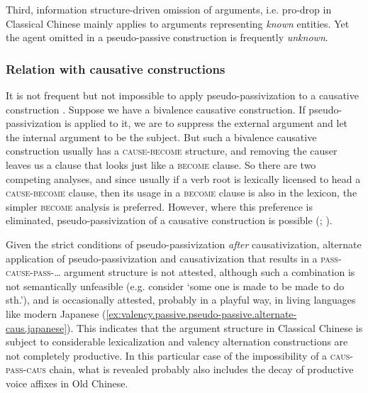 \documentclass[UTF8, a4paper, oneside, scheme=plain, 12pt]{ctexrep}
\newcommand*{\citepage}[1]{p.~{#1}}
\newcommand*{\citepages}[1]{pp.~{#1}}
\newcommand{\translate}[1]{`#1'}
\newcommand*{\category}[1]{\textsc{#1}}
\begin{document}
Third, information structure-driven omission of arguments, i.e. pro-drop in Classical Chinese mainly applies to arguments representing \emph{known} entities.
Yet the agent omitted in a pseudo-passive construction is frequently \emph{unknown}.

\subsubsection{Relation with causative constructions}\label{sec:grammatical.clause.verbal.argument-structure.pseudo-passive.causative-relation}

It is not frequent but not impossible to apply pseudo-passivization to a causative construction
\citep[\citepage{283}]{meiguang2018}.
Suppose we have a bivalence causative construction.
If pseudo-passivization is applied to it,
we are to suppress the external argument and let the internal argument to be the subject.
But such a bivalence causative construction usually has a \category{cause}-\category{become} structure,
and removing the causer leaves us a clause that looks just like a \category{become} clause.
So there are two competing analyses,
and since usually if a verb root is lexically licensed to head a \category{cause}-\category{become} clause,
then its usage in a \category{become} clause is also in the lexicon,
the simpler \category{become} analysis is preferred.
However, where this preference is eliminated, pseudo-passivization of a causative construction is possible 
(\citealt[\citepages{284,370-372}]{meiguang2018}; ).

Given the strict conditions of pseudo-passivization \emph{after} causativization,
alternate application of pseudo-passivization and causativization
that results in a \category{pass}-\category{cause}-\category{pass}-\dots{} argument structure is not attested,
although such a combination is not semantically unfeasible (e.g. consider \translate{some one is made to be made to do sth.}),
and is occasionally attested, probably in a playful way, in living languages like modern Japanese
(\ref{ex:valency.passive.pseudo-passive.alternate-caus.japanese}).
This indicates that the argument structure in Classical Chinese is subject to
considerable lexicalization and valency alternation constructions are not completely productive.
In this particular case of the impossibility of a \category{caus}-\category{pass}-\category{caus} chain,
what is revealed probably also includes the decay of productive voice affixes in Old Chinese.
\end{document}
